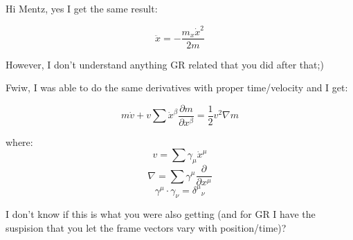 \documentclass{article}      %
\title{} %
\author{Peeter Joot}         %
\begin{document}

\maketitle{}

\section{}

Hi Mentz, yes I get the same result:

\begin{equation*}
\ddot{x} = -\frac{m_x \dot{x}^2}{2 m}
\end{equation*}

However, I don't understand anything GR related that you did after that;)

Fwiw, I was able to do the same derivatives with proper time/velocity and I get:

\begin{equation*}
m\dot{v} + v \sum \dot{x}^{\beta} \frac{\partial m}{\partial x^{\beta}} = \frac{1}{2} v^2 \nabla m
\end{equation*}

where:
\begin{equation*}
v = \sum \gamma_{\mu} \dot{x}^{\mu}
\end{equation*}
\begin{equation*}
\nabla = \sum \gamma^{\mu} \frac{\partial}{\partial x^{\mu}}
\end{equation*}
\begin{equation*}
\gamma^{\mu} \cdot \gamma_{\nu} = {\delta^{\mu}}_{\nu}
\end{equation*}

I don't know if this is what you were also getting (and for GR I have the suspision that you let the frame vectors vary with position/time)?
\end{document}
